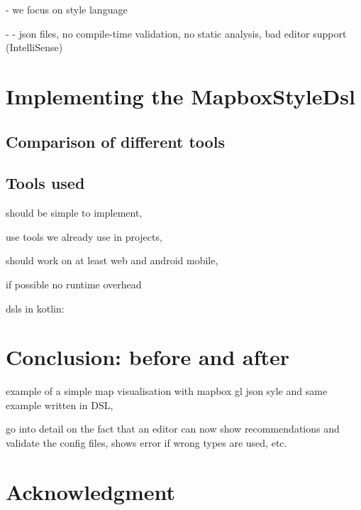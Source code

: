 \documentclass[conference]{IEEEtran}
\begin{document}
- we focus on style language

- - json files, no compile-time validation, no static analysis, bad editor support (IntelliSense)

\cite{mapbox2020style}

\cite{panek2020online}


\section{Implementing the MapboxStyleDsl}

\subsection{Comparison of different tools}

\cite{mernik2005and}


\subsection{Tools used}
should be simple to implement, 

use tools we already use in projects, 

should work on at least web and android mobile, 

if possible no runtime overhead

dsls in kotlin:

\cite{considine2019kotlin}


\section{Conclusion: before and after}
example of a simple map visualisation with mapbox gl json syle and same example written in DSL,

go into detail on the fact that an editor can now show recommendations and validate the config files, shows error if wrong types are used, etc.


\section*{Acknowledgment}


\end{document}
